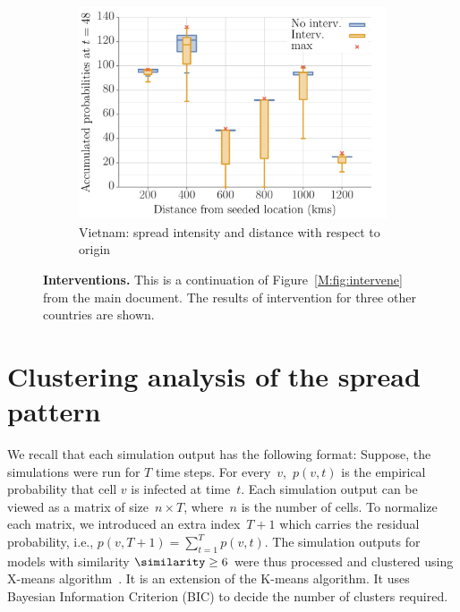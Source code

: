 \documentclass[10pt]{article}
\theoremstyle{definition}
\begin{document}
\begin{figure}[!ht]
\begin{subfigure}[b]{.32\textwidth}
\includegraphics[width=\textwidth]{../cellular_automata/results/dist_inf_plots/VN_dist_prob_B_box.pdf}
\caption{Vietnam: spread intensity and distance with respect to
origin\label{fig:vnmBContourBox}}
\end{subfigure}
\caption{\textbf{Interventions.} This is a continuation of
    Figure~\ref{M:fig:intervene} from the main document. The results of intervention for three
    other countries are shown. \label{fig:intervene}}
\end{figure}


\section{Clustering analysis of the spread pattern}
\label{sec:cluster}
We recall that each simulation output has the following format: Suppose,
the simulations were run for $T$ time steps. For every~$v$,~$p(v,t)$ is the
empirical probability  that cell $v$ is infected at time~$t$. Each
simulation output can be viewed as a matrix of size~$n\times T$, where~$n$
is the number of cells. To normalize each matrix, we introduced an extra
index~$T+1$ which carries the residual probability, i.e.,
$p(v,T+1)=\sum_{t=1}^Tp(v,t)$. The simulation outputs for models with similarity $\similarity\ge6$ were
thus processed and clustered using X-means
algorithm~\cite{pelleg2000x,andrei_novikov_2018_1491324}. It is an
extension of the K-means algorithm. It uses Bayesian Information Criterion
(BIC) to decide the number of clusters required. 
\end{document}
